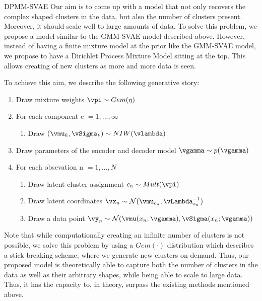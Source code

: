 \documentclass{article}
\begin{document}
\begin{psection}{DPMM-SVAE}
Our aim is to come up with a model that not only recovers the complex shaped clusters in the data, but also the number of clusters present. Moreover, it should scale well to large amounts of data. To solve this problem, we propose a model similar to the GMM-SVAE model described above. However, instead of having a finite mixture model at the prior like the GMM-SVAE model, we propose to have a Dirichlet Process Mixture Model sitting at the top. This allows creating of new clusters as more and more data is seen.

To achieve this aim, we describe the following generative story:

	\begin{enumerate}
		\item Draw mixture weights $\vpi \sim Gem(\eta)$
		\item {For each component  c $= 1,...,\infty$
			\begin{enumerate}
			    \item Draw $(\vmu_k,\vSigma_k) \sim NIW(\vlambda)$	
			\end{enumerate}}
		\item Draw parameters of the encoder and decoder model $\vgamma \sim p(\vgamma)$
		\item For each obsevation n $= 1,...,N$
				\begin{enumerate}
					\item Draw latent cluster assignment $c_n \sim Mult(\vpi)$
					\item Draw latent coordinates $\vx_n \sim \mathcal{N}(\vmu_{c_n},\vLambda_{z_n}^{-1})$
					\item Draw a data point $\vy_n \sim \mathcal{N}(\vmu(x_n;\vgamma),\vSigma(x_n;\vgamma))$
			\end{enumerate}
	\end{enumerate}
Note that while computationally creating an infinite number of clusters is not possible, we solve this problem by using a $Gem(\cdot)$ distribution which describes a stick breaking scheme, where we generate new clusters on demand. Thus, our proposed model is theoretically able to capture both the number of clusters in the data as well as their arbitrary shapes, while being able to scale to large data. Thus, it has the capacity to, in theory, surpass the existing methods mentioned above.
\end{psection}
\end{document}
